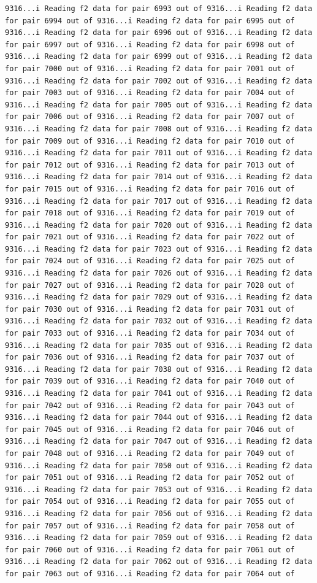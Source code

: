 \documentclass[
]{article}
\begin{document}
\begin{verbatim}
9316...i Reading f2 data for pair 6993 out of 9316...i Reading f2 data for pair 6994 out of 9316...i Reading f2 data for pair 6995 out of 9316...i Reading f2 data for pair 6996 out of 9316...i Reading f2 data for pair 6997 out of 9316...i Reading f2 data for pair 6998 out of 9316...i Reading f2 data for pair 6999 out of 9316...i Reading f2 data for pair 7000 out of 9316...i Reading f2 data for pair 7001 out of 9316...i Reading f2 data for pair 7002 out of 9316...i Reading f2 data for pair 7003 out of 9316...i Reading f2 data for pair 7004 out of 9316...i Reading f2 data for pair 7005 out of 9316...i Reading f2 data for pair 7006 out of 9316...i Reading f2 data for pair 7007 out of 9316...i Reading f2 data for pair 7008 out of 9316...i Reading f2 data for pair 7009 out of 9316...i Reading f2 data for pair 7010 out of 9316...i Reading f2 data for pair 7011 out of 9316...i Reading f2 data for pair 7012 out of 9316...i Reading f2 data for pair 7013 out of 9316...i Reading f2 data for pair 7014 out of 9316...i Reading f2 data for pair 7015 out of 9316...i Reading f2 data for pair 7016 out of 9316...i Reading f2 data for pair 7017 out of 9316...i Reading f2 data for pair 7018 out of 9316...i Reading f2 data for pair 7019 out of 9316...i Reading f2 data for pair 7020 out of 9316...i Reading f2 data for pair 7021 out of 9316...i Reading f2 data for pair 7022 out of 9316...i Reading f2 data for pair 7023 out of 9316...i Reading f2 data for pair 7024 out of 9316...i Reading f2 data for pair 7025 out of 9316...i Reading f2 data for pair 7026 out of 9316...i Reading f2 data for pair 7027 out of 9316...i Reading f2 data for pair 7028 out of 9316...i Reading f2 data for pair 7029 out of 9316...i Reading f2 data for pair 7030 out of 9316...i Reading f2 data for pair 7031 out of 9316...i Reading f2 data for pair 7032 out of 9316...i Reading f2 data for pair 7033 out of 9316...i Reading f2 data for pair 7034 out of 9316...i Reading f2 data for pair 7035 out of 9316...i Reading f2 data for pair 7036 out of 9316...i Reading f2 data for pair 7037 out of 9316...i Reading f2 data for pair 7038 out of 9316...i Reading f2 data for pair 7039 out of 9316...i Reading f2 data for pair 7040 out of 9316...i Reading f2 data for pair 7041 out of 9316...i Reading f2 data for pair 7042 out of 9316...i Reading f2 data for pair 7043 out of 9316...i Reading f2 data for pair 7044 out of 9316...i Reading f2 data for pair 7045 out of 9316...i Reading f2 data for pair 7046 out of 9316...i Reading f2 data for pair 7047 out of 9316...i Reading f2 data for pair 7048 out of 9316...i Reading f2 data for pair 7049 out of 9316...i Reading f2 data for pair 7050 out of 9316...i Reading f2 data for pair 7051 out of 9316...i Reading f2 data for pair 7052 out of 9316...i Reading f2 data for pair 7053 out of 9316...i Reading f2 data for pair 7054 out of 9316...i Reading f2 data for pair 7055 out of 9316...i Reading f2 data for pair 7056 out of 9316...i Reading f2 data for pair 7057 out of 9316...i Reading f2 data for pair 7058 out of 9316...i Reading f2 data for pair 7059 out of 9316...i Reading f2 data for pair 7060 out of 9316...i Reading f2 data for pair 7061 out of 9316...i Reading f2 data for pair 7062 out of 9316...i Reading f2 data for pair 7063 out of 9316...i Reading f2 data for pair 7064 out of 
\end{verbatim}
\end{document}

